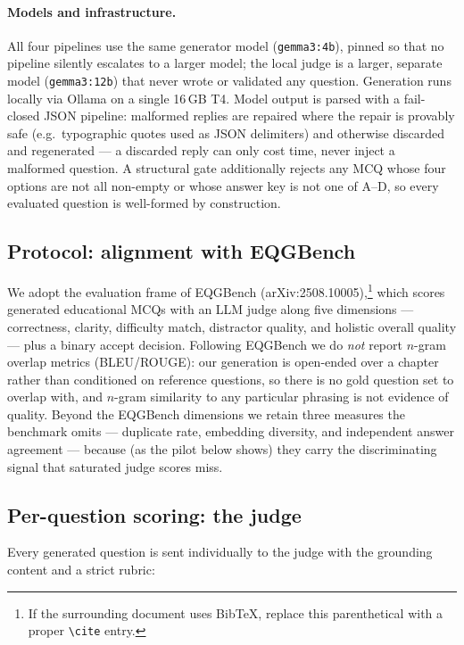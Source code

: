 \paragraph{Models and infrastructure.} All four pipelines use the same
generator model (\texttt{gemma3:4b}), pinned so that no pipeline silently
escalates to a larger model; the local judge is a larger, separate model
(\texttt{gemma3:12b}) that never wrote or validated any question. Generation
runs locally via Ollama on a single 16\,GB T4. Model output is parsed with a
fail-closed JSON pipeline: malformed replies are repaired where the repair is
provably safe (e.g.\ typographic quotes used as JSON delimiters) and otherwise
discarded and regenerated --- a discarded reply can only cost time, never
inject a malformed question. A structural gate additionally rejects any MCQ
whose four options are not all non-empty or whose answer key is not one of
A--D, so every evaluated question is well-formed by construction.

\subsection{Protocol: alignment with EQGBench}
\label{sec:eval-protocol}

We adopt the evaluation frame of EQGBench
(arXiv:2508.10005),\footnote{If the surrounding document uses BibTeX, replace
this parenthetical with a proper \texttt{\textbackslash cite} entry.} which scores
generated educational MCQs with an LLM judge along five dimensions ---
correctness, clarity, difficulty match, distractor quality, and holistic
overall quality --- plus a binary accept decision. Following EQGBench we do
\emph{not} report $n$-gram overlap metrics (BLEU/ROUGE): our generation is
open-ended over a chapter rather than conditioned on reference questions, so
there is no gold question set to overlap with, and $n$-gram similarity to any
particular phrasing is not evidence of quality. Beyond the EQGBench
dimensions we retain three measures the benchmark omits --- duplicate rate,
embedding diversity, and independent answer agreement --- because (as the
pilot below shows) they carry the discriminating signal that saturated judge
scores miss.

\subsection{Per-question scoring: the judge}
\label{sec:eval-judge}

Every generated question is sent individually to the judge with the grounding
content and a strict rubric:

